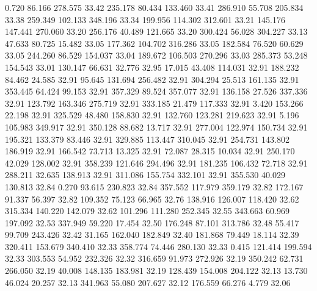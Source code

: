    0.720   86.166  278.575        33.42
 235.178   80.434  133.460        33.41
 286.910   55.708  205.834        33.38
 259.349  102.133  348.196        33.34
 199.956  114.302  312.601        33.21
 145.176  147.441  270.060        33.20
 256.176   40.489  121.665        33.20
 300.424   56.028  304.227        33.13
  47.633   80.725   15.482        33.05
 177.362  104.702  316.286        33.05
 182.584   76.520   60.629        33.05
 244.260   86.529  154.037        33.04
 189.672  106.503  270.296        33.03
 285.373   53.248  154.543        33.01
 130.147   66.631   32.776        32.95
  17.015   43.408  114.031        32.91
 188.232   84.462   24.585        32.91
  95.645  131.694  256.482        32.91
 304.294   25.513  161.135        32.91
 353.445   64.424   99.153        32.91
 357.329   89.524  357.077        32.91
 136.158   27.526  337.336        32.91
 123.792  163.346  275.719        32.91
 333.185   21.479  117.333        32.91
   3.420  153.266   22.198        32.91
 325.529   48.480  158.830        32.91
 132.760  123.281  219.623        32.91
   5.196  105.983  349.917        32.91
 350.128   88.682   13.717        32.91
 277.004  122.974  150.734        32.91
 195.321  133.379   83.446        32.91
 329.885  113.447  310.045        32.91
 254.731  143.802  186.919        32.91
 166.542   73.713   13.325        32.91
  72.087   28.315   10.034        32.91
 250.170   42.029  128.002        32.91
 358.239  121.646  294.496        32.91
 181.235  106.432   72.718        32.91
 288.211   32.635  138.913        32.91
 311.086  155.754  332.101        32.91
 355.530   40.029  130.813        32.84
   0.270   93.615  230.823        32.84
 357.552  117.979  359.179        32.82
 172.167   91.337   56.397        32.82
 109.352   75.123   66.965        32.76
 138.916  126.007  118.420        32.62
 315.334  140.220  142.079        32.62
 101.296  111.280  252.345        32.55
 343.663   60.969  197.092        32.53
 337.949   59.220   17.454        32.50
 176.248   87.101  313.786        32.48
  55.417   99.709  243.426        32.42
  31.165  162.040  182.849        32.40
 181.868   79.449   18.114        32.39
 320.411  153.679  340.410        32.33
 358.774   74.446  280.130        32.33
   0.415  121.414  199.594        32.33
 303.553   54.952  232.326        32.32
 316.659   91.973  272.926        32.19
 350.242   62.731  266.050        32.19
  40.008  148.135  183.981        32.19
 128.439  154.008  204.122        32.13
  13.730   46.024   20.257        32.13
 341.963   55.080  207.627        32.12
 176.559   66.276    4.779        32.06
